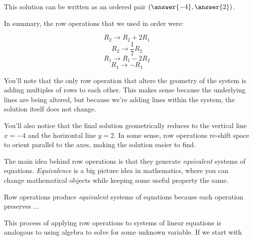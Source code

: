 \documentclass{ximera}
\begin{document}
\begin{exploration}
\begin{example}
    This solution can be written as an ordered pair $(\answer{-4}, \answer{2})$.
    
        \begin{solution}
    
            In summary, the row operations that we used in  order were:
    
            $$R_2\rightarrow R_2+2R_1$$
            $$R_2\rightarrow \frac{1}{7}R_2$$
            $$R_1\rightarrow R_1-2R_2$$
            $$R_1\rightarrow -R_1$$

        You'll note that the only row operation that alters the geometry of the system is adding multiples of rows to each other. This makes sense because the underlying lines are being altered, but because we're adding lines within the system, the solution itself does not change.

        You'll also notice that the final solution geometrically reduces to the vertical line $x=-4$ and the horizontal line $y=2$. In some sense, row operations re-shift space to orient parallel to the axes, making the solution easier to find.
    
        \end{solution}

      \end{example}
    
    The main idea behind row operations is that they generate \emph{equivalent} systems of equations. \emph{Equivalence} is a big picture idea in mathematics, where you can change mathematical objects while keeping some useful property the same.
    
    \begin{example}
    
        Row operations produce \emph{equivalent} systems of equations because each operation preserves $\ldots$
    
        \begin{multipleChoice}
        \end{multipleChoice}
    
    \end{example}

    \begin{remark}
      This process of applying row operations to systems of linear equations is analogous to using algebra to solve for some unknown variable. If we start with 
      

\end{remark}
\end{exploration}
\end{document}
